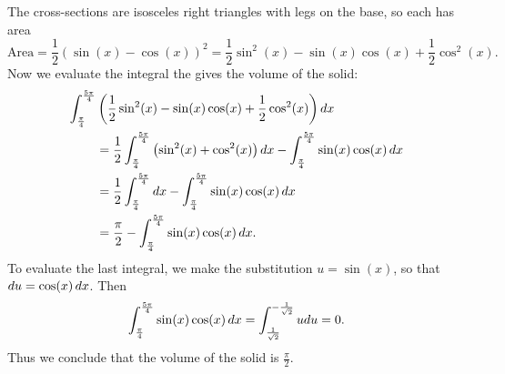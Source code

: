 \documentclass[handout]{ximera}
\begin{document}
\begin{problem}
\begin{freeResponse}
\begin{enumerate}
	The cross-sections are isosceles right triangles with legs on the base, so each has area 
	\[
	\text{Area} = \frac12 \left( \sin(x) - \cos(x) \right)^2 = \frac12 \sin^2(x) - \sin(x)\cos(x) + \frac12 \cos^2(x).
	\]
	Now we evaluate the integral the gives the volume of the solid:
	\begin{align*}
		\int_{\frac \pi 4}^{\frac{5\pi}{4}} &\left( \frac12 \sin^2(x) - \sin(x)\cos(x) + \frac12 \cos^2(x)\right) \mathop{}\!d x	\\	
			&=	\frac12 \int_{\frac \pi 4}^{\frac{5\pi}{4}} \left(  \sin^2(x) +\cos^2(x) \right) \mathop{}\!d x-  \int_{\frac \pi 4}^{\frac{5\pi}{4}} \sin(x)\cos(x)  \mathop{}\!d x 	\\
			&=	\frac12 \int_{\frac \pi 4}^{\frac{5\pi}{4}} \mathop{}\!d x -  \int_{\frac \pi 4}^{\frac{5\pi}{4}} \sin(x)\cos(x)  \mathop{}\!d x \\
			&=	\frac{\pi}{2} -  \int_{\frac \pi 4}^{\frac{5\pi}{4}} \sin(x)\cos(x)  \mathop{}\!d x .
	\end{align*}
	To evaluate the last integral, we make the substitution $u = \sin(x)$, so that $\mathop{}\!d u = \cos(x) \mathop{}\!d x$. Then 
	\[
	 \int_{\frac \pi 4}^{\frac{5\pi}{4}} \sin(x)\cos(x)  \mathop{}\!d x  = \int_{\frac{1}{\sqrt{2}}}^{-\frac{1}{\sqrt{2}}} u du = 0.
	\]
	Thus we conclude that the volume of the solid is $\frac{\pi}{2}$.
\end{enumerate}
\end{freeResponse}
\end{problem}

\end{document}
